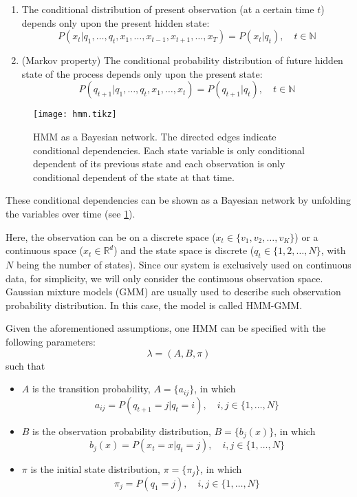 \documentclass[12pt,final,twoside]{report}
\begin{document}
\begin{enumerate}
  \item The conditional distribution of present observation (at a certain time $t$) depends only upon the present hidden state:
    \begin{equation}
      P(x_t|q_1, \dots, q_t, x_1, \dots, x_{t-1},x_{t+1},\dots,x_T) = P(x_t|q_t), \quad t \in \mathbb{N} 
      \label{eq:ob_prob}
    \end{equation}
  \item (Markov property) The conditional probability distribution of future hidden state of the process depends only upon the present state:
    \begin{equation}
      P(q_{t+1}|q_1, \dots, q_t, x_1, \dots, x_t) = P(q_{t+1}|q_t),\quad t \in \mathbb{N}
      \label{eq:markov_prop}
    \end{equation}
\end{enumerate}

\begin{figure}[t]
  \centering
  \texttt{[image: hmm.tikz]}
  \caption[HMM as a Bayesian network.]{HMM as a Bayesian network. The directed edges indicate conditional dependencies. Each state variable is only conditional dependent of its previous state and each observation is only conditional dependent of the state at that time.}
  \label{fig:hmm}
\end{figure}

These conditional dependencies can be shown as a Bayesian network by unfolding the variables over time (see \cref{fig:hmm}).

Here, the observation can be on a discrete space ($x_t \in \{v_1, v_2, \dots, v_K\}$) or a continuous space ($x_t \in \mathbb{R}^d$) and the state space is discrete ($q_t \in \{1, 2, \dots, N\}$, with $N$ being the number of states). Since our system is exclusively used on continuous data, for simplicity, we will only consider the continuous observation space. Gaussian mixture models (GMM) are usually used to describe such observation probability distribution. In this case, the model is called HMM-GMM.

Given the aforementioned assumptions, one HMM can be specified with the following parameters:
\[ \lambda = (A, B, \pi) \]
such that
\begin{itemize}
  \item $A$ is the transition probability, $A = \{a_{ij}\}$, in which 
    \[ a_{ij} = P(q_{t+1} = j | q_t = i), \quad i,j \in \{1, \dots, N\} \]
  \item $B$ is the observation probability distribution, $B = \{b_j(x)\}$, in which
    \[ b_j(x) = P(x_t = x | q_t = j), \quad i,j \in \{1, \dots, N\} \]
  \item $\pi$ is the initial state distribution, $\pi = \{\pi_j\}$, in which
    \[ \pi_j = P(q_1 = j), \quad i,j \in \{1, \dots, N\} \]
\end{itemize}
\end{document}
